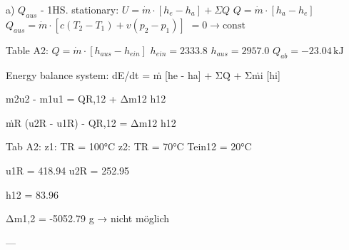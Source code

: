 a) \( Q_{aus} \)  
- 1HS. stationary: \( U = \dot{m} \cdot [h_e - h_a] + \Sigma Q \)  
\( Q = \dot{m} \cdot [h_a - h_e] \)  
\( Q_{aus} = \dot{m} \cdot [c(T_2 - T_1) + v(p_2 - p_1)] \)  
\( = 0 \rightarrow \text{const} \)  

Table A2: \( Q = \dot{m} \cdot [h_{aus} - h_{ein}] \)  
\( h_{ein} = 2333.8 \)  
\( h_{aus} = 2957.0 \)  
\( Q_{ab} = -23.04 \, \text{kJ} \)

Energy balance system:  
dE/dt = ṁ [he - ha] + ΣQ̇ + Σṁi [hi]  

m2u2 - m1u1 = QR,12 + Δm12 h12  

ṁR (u2R - u1R) - QR,12 = Δm12 h12  

Tab A2:  
z1: TR = 100°C  
z2: TR = 70°C  
Tein12 = 20°C  

u1R = 418.94  
u2R = 252.95  

h12 = 83.96  

Δm1,2 = -5052.79 g → nicht möglich  

---